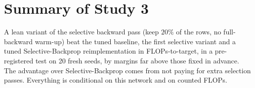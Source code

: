 \section{Summary of Study 3}
A lean variant of the selective backward pass (keep $20\%$ of the rows, no full-backward warm-up) beat the tuned baseline, the first selective variant and a tuned Selective-Backprop reimplementation in FLOPs-to-target, in a pre-registered test on 20 fresh seeds, by margins far above those fixed in advance. The advantage over Selective-Backprop comes from not paying for extra selection passes. Everything is conditional on this network and on counted FLOPs.
